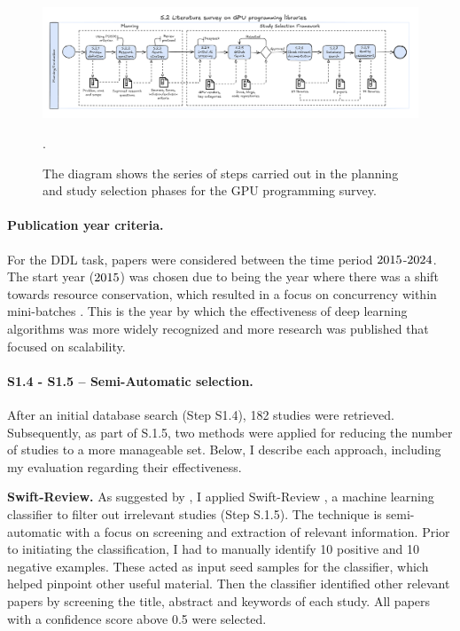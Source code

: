 \begin{figure}[th]
	\centering
	\includegraphics[width=\linewidth]{figures/survey-cuda3.pdf}
	\caption{The diagram shows the series of steps carried out in the planning and study selection
		phases for the GPU programming survey.}.
	\label{fig:workflow-study-cuda}
\end{figure}

\paragraph{Publication year criteria.}
For the DDL task, papers were considered between the time period $2015$-$2024$. The
start year ($2015$) was chosen due to being the year where there was a shift towards
resource conservation, which resulted in a focus on concurrency within mini-batches
\cite{ben-nun_demystifying_2020}. This is the year by which the effectiveness of deep learning
algorithms was more widely recognized and more research was published that focused on scalability.

\paragraph{S1.4 - S1.5 -- Semi-Automatic selection.}
After an initial database search (Step S1.4), 182 studies were retrieved. Subsequently, as part of
S.1.5, two methods were applied for reducing the number of studies to a more manageable set. Below,
I describe each approach, including my evaluation regarding their effectiveness.

\textbf{Swift-Review.}
As suggested by \cite{bolanos_artificial_2024},
I applied Swift-Review \cite{Howard2016SWIFTReviewAT}, a machine learning classifier to filter out
irrelevant studies (Step S.1.5). The technique is semi-automatic
with a focus on screening and extraction of relevant information. Prior to initiating the classification,
I had to manually identify 10 positive and 10 negative examples. These
acted as input seed samples for the classifier, which helped pinpoint other useful material. Then
the classifier identified other relevant papers by screening the title, abstract and keywords of
each study. All papers with a confidence score above 0.5 were selected.

